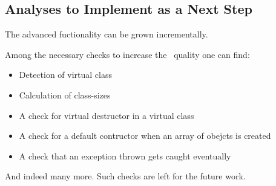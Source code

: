 \subsection{Analyses to Implement as a Next Step}

The advanced  fuctionality can be grown incrementally. 

Among the necessary checks to increase the \pcpp\ quality one can find:
\begin{itemize}
 \item Detection of virtual class
 \item Calculation of class-sizes
 \item A check for virtual destructor in a virtual class
 \item A check for a default contructor when an array of obejcts is created
 \item A check that an exception thrown gets caught eventually
\end{itemize}

And indeed many more. Such checks are left for the future work.



